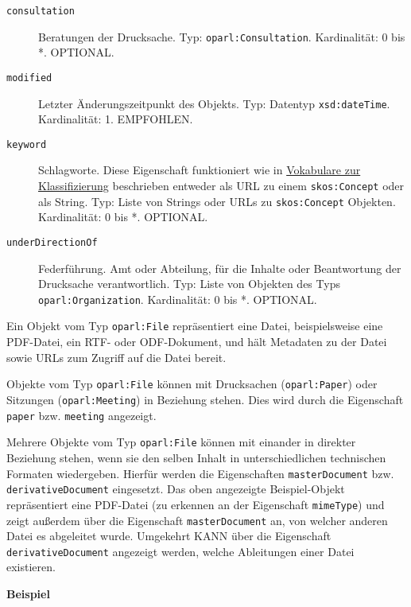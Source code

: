 \documentclass[,a4paper]{article}
\begin{document}
\begin{description}
\item[\texttt{consultation}]
Beratungen der Drucksache. Typ: \texttt{oparl:Consultation}.
Kardinalität: 0 bis *. OPTIONAL.
\item[\texttt{modified}]
Letzter Änderungszeitpunkt des Objekts. Typ: Datentyp
\texttt{xsd:dateTime}. Kardinalität: 1. EMPFOHLEN.
\item[\texttt{keyword}]
Schlagworte. Diese Eigenschaft funktioniert wie in
\hyperref[vokabulareux5fklassifizierung]{Vokabulare zur Klassifizierung}
beschrieben entweder als URL zu einem \texttt{skos:Concept} oder als
String. Typ: Liste von Strings oder URLs zu \texttt{skos:Concept}
Objekten. Kardinalität: 0 bis *. OPTIONAL.
\item[\texttt{underDirectionOf}]
Federführung. Amt oder Abteilung, für die Inhalte oder Beantwortung der
Drucksache verantwortlich. Typ: Liste von Objekten des Typs
\texttt{oparl:Organization}. Kardinalität: 0 bis *. OPTIONAL.
\end{description}


Ein Objekt vom Typ \texttt{oparl:File} repräsentiert eine Datei,
beispielsweise eine PDF-Datei, ein RTF- oder ODF-Dokument, und hält
Metadaten zu der Datei sowie URLs zum Zugriff auf die Datei bereit.

Objekte vom Typ \texttt{oparl:File} können mit Drucksachen
(\texttt{oparl:Paper}) oder Sitzungen (\texttt{oparl:Meeting}) in
Beziehung stehen. Dies wird durch die Eigenschaft \texttt{paper} bzw.
\texttt{meeting} angezeigt.

Mehrere Objekte vom Typ \texttt{oparl:File} können mit einander in
direkter Beziehung stehen, wenn sie den selben Inhalt in
unterschiedlichen technischen Formaten wiedergeben. Hierfür werden die
Eigenschaften \texttt{masterDocument} bzw. \texttt{derivativeDocument}
eingesetzt. Das oben angezeigte Beispiel-Objekt repräsentiert eine
PDF-Datei (zu erkennen an der Eigenschaft \texttt{mimeType}) und zeigt
außerdem über die Eigenschaft \texttt{masterDocument} an, von welcher
anderen Datei es abgeleitet wurde. Umgekehrt KANN über die Eigenschaft
\texttt{derivativeDocument} angezeigt werden, welche Ableitungen einer
Datei existieren.

\textbf{Beispiel}
\end{document}
